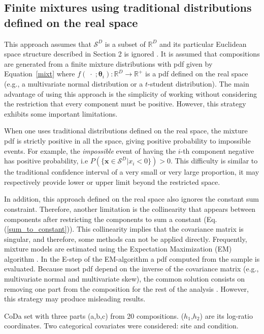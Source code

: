\documentclass[12pt, a4paper]{article}
\newcommand{\m}[1]{\boldsymbol{#1}}
\begin{document}
\subsection{Finite mixtures using traditional distributions defined on the real space}
\label{real_section}

This approach assumes that $\mathcal{S}^D$ is a subset of $\mathbb{R}^D$ and its particular Euclidean space structure described in Section 2 is ignored \citep[see][]{papageorgiou2001model}. It is assumed that compositions  are generated from a finite mixture distributions with pdf given by Equation~\ref{mixt} where $f(\;\cdot\;;\m\theta_i): \mathbb{R}^D \rightarrow \mathbb{R}^+$ is a pdf defined on the real space (e.g., a multivariate normal distribution or a  $t$-student distribution). The main advantage of using this approach is the simplicity of working without considering the restriction that every component must be positive. However, this strategy exhibits some important limitations.

When one uses traditional distributions defined on the real space, the mixture pdf is strictly positive in all the space, giving positive probability to impossible events. For example, the \emph{impossible} event  of having the $i$-th component negative has positive probability, i.e $P(\{ \textbf{x} \in \mathcal{S}^D | x_i < 0 \}) > 0$. This difficulty is similar to the traditional confidence interval of a very small or very large proportion, it may respectively provide lower or upper limit beyond the restricted space. 

In addition, this approach defined on the real space also ignores the constant sum constraint. Therefore, another limitation is the collinearity that appears between components  after restricting the components to sum a constant (Eq. (\ref{sum_to_constant})). This collinearity implies that the covariance matrix is singular, and therefore, some methods can not be applied directly. Frequently, mixture models are estimated using the Expectation Maximization (EM) algorithm \citep{dempster1977maximum}. In the E-step of the EM-algorithm a pdf computed from the sample is evaluated. Because most pdf depend on the inverse of the covariance matrix (e.g., multivariate normal and multivariate skew), the common solution consists on removing one part from the composition for the rest of the analysis \citep{papageorgiou2001model}. However, this strategy may  produce misleading results.   


\begin{table}
\centering
\scriptsize

\caption{CoDa set with three parts (a,b,c) from 20 compositions. ($h_1$,$h_2$) are its log-ratio coordinates.
Two categorical covariates were considered: site and condition. }
\label{example_elim_tab}
\end{table}
\end{document}
